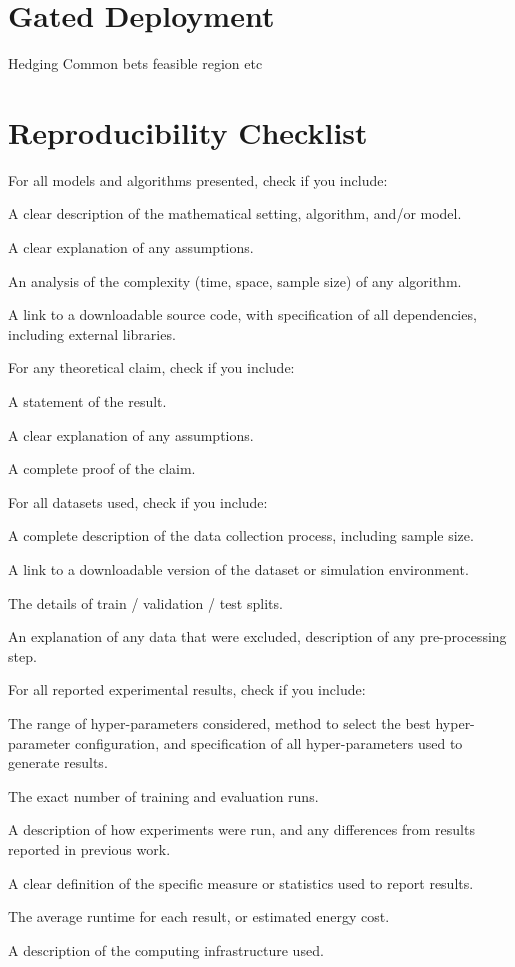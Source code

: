 \section{Gated Deployment}
\label{app:gd}
Hedging
Common bets feasible region etc

\section{Reproducibility Checklist}
For all models and algorithms presented, check if you include:

A clear description of the mathematical setting, algorithm, and/or model.

A clear explanation of any assumptions.

An analysis of the complexity (time, space, sample size) of any algorithm.

A link to a downloadable source code, with specification of all dependencies, including external libraries.

For any theoretical claim, check if you include:

A statement of the result.

A clear explanation of any assumptions.

A complete proof of the claim.

For all datasets used, check if you include:

A complete description of the data collection process, including sample size.

A link to a downloadable version of the dataset or simulation environment.

The details of train / validation / test splits.

An explanation of any data that were excluded, description of any pre-processing step.

For all reported experimental results, check if you include:

The range of hyper-parameters considered, method to select the best hyper-parameter configuration, and specification of all hyper-parameters used to generate results.

The exact number of training and evaluation runs.

A description of how experiments were run, and any differences from results reported in previous work.

A clear definition of the specific measure or statistics used to report results.

The average runtime for each result, or estimated energy cost.

A description of the computing infrastructure used.
